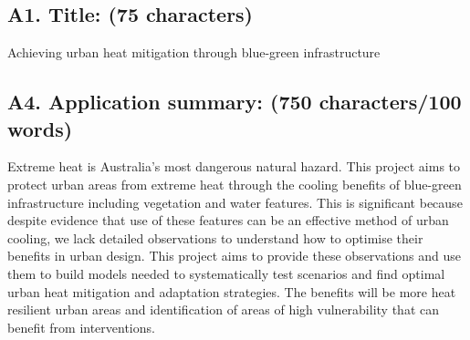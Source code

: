 \subsection*{\TitleFont A1. Title: (75 characters) }


Achieving urban heat mitigation through blue-green infrastructure



\subsection*{\TitleFont A4. Application summary: (750 characters/100 words) }







Extreme heat is Australia's most dangerous natural hazard. This project aims to protect urban areas from extreme heat through the cooling benefits of blue-green infrastructure including vegetation and water features. This is significant because despite evidence that use of these features can be an effective method of urban cooling, we lack detailed observations to understand how to optimise their benefits in urban design. This project aims to provide these observations and use them to build models needed to systematically test scenarios and find optimal urban heat mitigation and adaptation strategies. The benefits will be more heat resilient urban areas and identification of areas of high vulnerability that can benefit from interventions.

